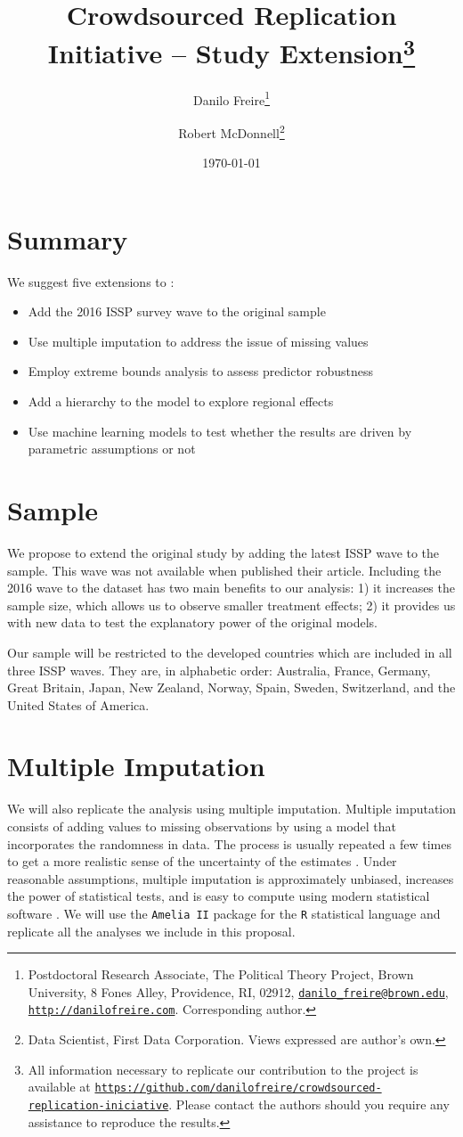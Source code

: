 \documentclass[a4paper,12pt]{article}
\title{Crowdsourced Replication Initiative -- Study Extension\thanks{All information necessary to replicate our contribution to the project is available at \href{https://github.com/danilofreire/crowdsourced-replication-iniciative}{\texttt{https://github.com/danilofreire/crowdsourced-replication-iniciative}}. Please contact the authors should you require any assistance to reproduce the results.}}
\author{Danilo Freire\thanks{Postdoctoral Research Associate, The Political Theory Project, Brown University, 8 Fones Alley, Providence, RI, 02912, \href{mailto:danilo_freire@brown.edu}{\texttt{danilo\_freire@brown.edu}}, \href{http://danilofreire.com}{\texttt{http://danilofreire.com}}. Corresponding author.} \and Robert McDonnell\thanks{Data Scientist, First Data Corporation. Views expressed are author's own.}}
\date{\today}
\begin{document}
\maketitle

\doublespacing

\section{Summary}

We suggest five extensions to \citet{brady2014does}:

\begin{itemize}
    \item Add the 2016 ISSP survey wave to the original sample
    \item Use multiple imputation to address the issue of missing values
    \item Employ extreme bounds analysis to assess predictor robustness
    \item Add a hierarchy to the model to explore regional effects
    \item Use machine learning models to test whether the results are driven by parametric assumptions or not
\end{itemize}

\section{Sample}

We propose to extend the original study by adding the latest ISSP wave to the sample. This wave was not available when \cite{brady2014does} published their article. Including the 2016 wave to the dataset has two main benefits to our analysis: 1) it increases the sample size, which allows us to observe smaller treatment effects; 2) it provides us with new data to test the explanatory power of the original models.

Our sample will be restricted to the developed countries which are included in all three ISSP waves. They are, in alphabetic order: Australia, France, Germany, Great Britain, Japan, New Zealand, Norway, Spain, Sweden, Switzerland, and the United States of America.

\section{Multiple Imputation}

We will also replicate the analysis using multiple imputation. Multiple imputation consists of adding values to missing observations by using a model that incorporates the randomness in data. The process is usually repeated a few times to get a more realistic sense of the uncertainty of the estimates \citep{little1989analysis, rubin1987multiple}. Under reasonable assumptions, multiple imputation is approximately unbiased, increases the power of statistical tests, and is easy to compute using modern statistical software \citep{lall2016multiple}. We will use the \texttt{Amelia II} package \citep{honaker2011amelia} for the \texttt{R} statistical language \citep{r2018} and replicate all the analyses we include in this proposal.
\end{document}
